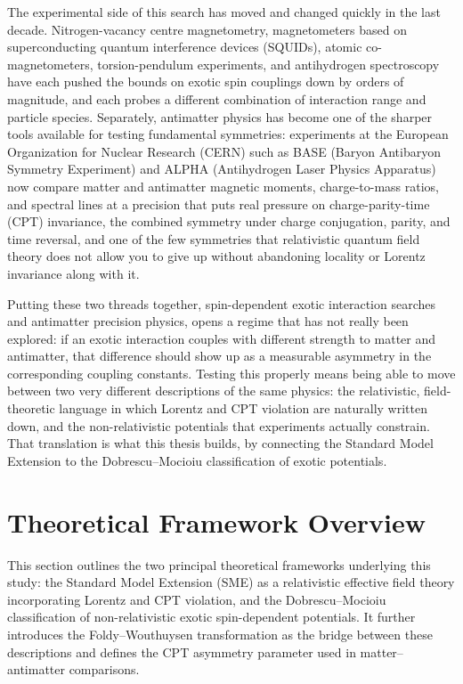 \documentclass[main]{subfiles}
\begin{document}
The experimental side of this search has moved and changed quickly in the last decade.
Nitrogen-vacancy centre magnetometry, magnetometers based on superconducting
quantum interference devices (SQUIDs), atomic co-magnetometers,
torsion-pendulum experiments, and antihydrogen spectroscopy
have each pushed the bounds on exotic spin couplings down by orders of
magnitude, and each probes a different combination of interaction range and
particle species. Separately, antimatter physics has become one of the sharper
tools available for testing fundamental symmetries: experiments at the
European Organization for Nuclear Research (CERN) such as BASE (Baryon
Antibaryon Symmetry Experiment) and ALPHA (Antihydrogen Laser Physics
Apparatus) now compare matter and antimatter magnetic moments,
charge-to-mass ratios, and spectral lines at a precision that puts real
pressure on charge-parity-time (CPT) invariance, the combined symmetry
under charge conjugation, parity, and time reversal, and one of the few
symmetries that relativistic quantum field theory does not allow you to
give up without abandoning locality or Lorentz invariance along with it.

Putting these two threads together, spin-dependent exotic interaction
searches and antimatter precision physics, opens a regime that has not
really been explored: if an exotic interaction couples with different strength
to matter and antimatter, that difference should show up as a measurable
asymmetry in the corresponding coupling constants. Testing this properly
means being able to move between two very different descriptions of the same
physics: the relativistic, field-theoretic language in which Lorentz and CPT
violation are naturally written down, and the non-relativistic potentials that
experiments actually constrain. That translation is what this thesis builds,
by connecting the Standard Model Extension to the Dobrescu--Mocioiu
classification of exotic potentials.

\section{Theoretical Framework Overview}

This section outlines the two principal theoretical frameworks underlying this
study: the Standard Model Extension (SME) as a relativistic effective field
theory incorporating Lorentz and CPT violation, and the Dobrescu--Mocioiu
classification of non-relativistic exotic spin-dependent potentials. It further
introduces the Foldy--Wouthuysen transformation as the bridge between these
descriptions and defines the CPT asymmetry parameter used in matter--antimatter
comparisons.
\end{document}
